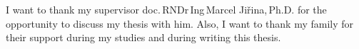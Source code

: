 \documentclass[english,master,unicode]{ctufit-thesis}
\theoremstyle{plain}
\theoremstyle{definition}
\theoremstyle{remark}
\numberwithin{theorem}{chapter}
\begin{document}
    \frontmatter\frontmatterinit %


    \thispagestyle{empty}\cleardoublepage\maketitle %

    \imprintpage %

    \tableofcontents %
    \listoffigures %
    \begingroup
    \let\clearpage\relax
    \listoftables %
    \listofalgorithms
    \listoflistings %
    \endgroup

    \begin{acknowledgmentpage}
        I want to thank my supervisor doc.\,RNDr\,Ing\,Marcel Jiřina,\,Ph.D. for the opportunity to discuss my thesis with him.
        Also, I want to thank my family for their support during my studies and during writing this thesis.
    \end{acknowledgmentpage}
\end{document}
